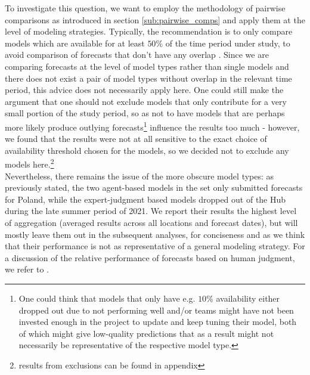 To investigate this question, we want to employ the methodology of pairwise comparisons as introduced in section \ref{sub:pairwise_comps} and apply them at the level of modeling strategies. Typically, the recommendation is to only compare models which are available for at least $50\% $ of the time period under study, to avoid comparison of forecasts that don't have any overlap \citep{bosse_epiforecastsscoringutils_2022}. Since we are comparing forecasts at the level of model types rather than single models and there does not exist a pair of model types without overlap in the relevant time period, this advice does not necessarily apply here. One could still make the argument that one should not exclude models that only contribute for a very small portion of the study period, so as not to have models that are perhaps more likely produce outlying forecasts\footnote{One could think that models that only have e.g. $10\%$ availability either dropped out due to not performing well and/or teams might have not been invested enough in the project to update and keep tuning their model, both of which might give low-quality predictions that as a result might not necessarily be representative of the respective model type.} influence the results too much - however, we found that the results were not at all sensitive to the exact choice of availability threshold chosen for the models, so we decided not to exclude any models here.\footnote{results from exclusions can be found in appendix} \\ 
Nevertheless, there remains the issue of the more obscure model types: as previously stated, the two agent-based models in the set only submitted forecasts for Poland, while the expert-judgment based models dropped out of the Hub during the late summer period of 2021. We report their results the highest level of aggregation (averaged results across all locations and forecast dates), but will mostly leave them out in the subsequent analyses, for conciseness and as we think that their performance is not as representative of a general modeling strategy. For a discussion of the relative performance of forecasts based on human judgment, we refer to \cite{bosse_comparing_2021}.\\ %
